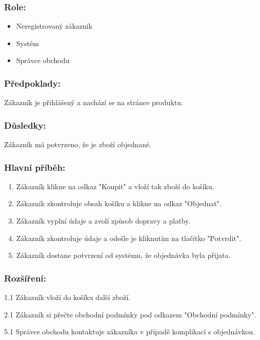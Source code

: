 \documentclass[11pt,twoside,a4paper]{book}
\begin{document}
\subsubsection*{Role:}

\begin{itemize}
\item Neregistrovaný zákazník
\item Systém
\item Správce obchodu
\end{itemize}

\subsubsection*{Předpoklady:}

Zákazník je přihlášený a nachází se na stránce produktu.


\subsubsection*{Důsledky:}

Zákazník má potvrzeno, že je zboží objednané.

\subsubsection*{Hlavní příběh:}

\begin{enumerate}
\item Zákazník klikne na odkaz "Koupit" a vloží tak zboží do košíku.
\item Zákazník zkontroluje obsah košíku a klikne na odkaz "Objednat".
\item Zákazník vyplní údaje a zvolí způsob dopravy a platby.
\item Zákazník zkontroluje údaje a odešle je kliknutím na tlačítko "Potvrdit".
\item Zákazník dostane potvrzení od systému, že objednávka byla přijata.
\end{enumerate}

\subsubsection*{Rozšíření:}

\begin{description}
\item 1.1 Zákazník vloží do košíku další zboží.
\item 2.1 Zákazník si přečte obchodní podmínky pod odkazem "Obchodní podmínky".
\item 5.1 Správce obchodu kontaktuje zákazníka v případě komplikací s objednávkou.
\end{description}
\end{document}
